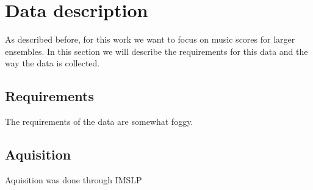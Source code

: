 \chapter{Data description}

As described before, for this work we want to focus on music scores for larger ensembles. In this section we will describe the requirements for this data and the way the data is collected.

\section{Requirements}
The requirements of the data are somewhat foggy. \cite{Bainbridge2001}

\section{Aquisition}
Aquisition was done through IMSLP

